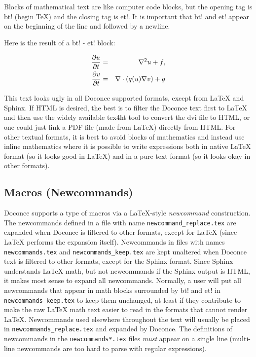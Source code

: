 \documentclass{article}
\begin{document}
\label{mathtext}

Blocks of mathematical text are like computer code blocks, but
the opening tag is {\fontsize{10pt}{10pt}\verb!!bt!} (begin TeX) and the closing tag is
{\fontsize{10pt}{10pt}\verb!!et!}. It is important that {\fontsize{10pt}{10pt}\verb!!bt!} and {\fontsize{10pt}{10pt}\verb!!et!} appear on the beginning of the
line and followed by a newline. 

Here is the result of a {\fontsize{10pt}{10pt}\verb!!bt!} - {\fontsize{10pt}{10pt}\verb!!et!} block:

\begin{eqnarray}
{\partial u\over\partial t} &=& \nabla^2 u + f,\label{myeq1}\\
{\partial v\over\partial t} &=& \nabla\cdot(q(u)\nabla v) + g
\end{eqnarray}

This text looks ugly in all Doconce supported formats, except from
{\LaTeX} and Sphinx.  If HTML is desired, the best is to filter the Doconce text
first to {\LaTeX} and then use the widely available tex4ht tool to
convert the dvi file to HTML, or one could just link a PDF file (made
from {\LaTeX}) directly from HTML. For other textual formats, it is best
to avoid blocks of mathematics and instead use inline mathematics
where it is possible to write expressions both in native {\LaTeX} format
(so it looks good in {\LaTeX}) and in a pure text format (so it looks
okay in other formats).

\subsection{Macros (Newcommands)}

\label{newcommands}

Doconce supports a type of macros via a {\LaTeX}-style \emph{newcommand}
construction.  The newcommands defined in a file with name
{\fontsize{10pt}{10pt}\verb!newcommand_replace.tex!} are expanded when Doconce is filtered to
other formats, except for {\LaTeX} (since {\LaTeX} performs the expansion
itself).  Newcommands in files with names {\fontsize{10pt}{10pt}\verb!newcommands.tex!} and
{\fontsize{10pt}{10pt}\verb!newcommands_keep.tex!} are kept unaltered when Doconce text is
filtered to other formats, except for the Sphinx format. Since Sphinx
understands {\LaTeX} math, but not newcommands if the Sphinx output is
HTML, it makes most sense to expand all newcommands.  Normally, a user
will put all newcommands that appear in math blocks surrounded by
{\fontsize{10pt}{10pt}\verb!!bt!} and {\fontsize{10pt}{10pt}\verb!!et!} in {\fontsize{10pt}{10pt}\verb!newcommands_keep.tex!} to keep them unchanged, at
least if they contribute to make the raw {\LaTeX} math text easier to
read in the formats that cannot render {\LaTeX}.  Newcommands used
elsewhere throughout the text will usually be placed in
{\fontsize{10pt}{10pt}\verb!newcommands_replace.tex!} and expanded by Doconce.  The definitions of
newcommands in the {\fontsize{10pt}{10pt}\verb!newcommands*.tex!} files \emph{must} appear on a single
line (multi-line newcommands are too hard to parse with regular
expressions).
\end{document}
